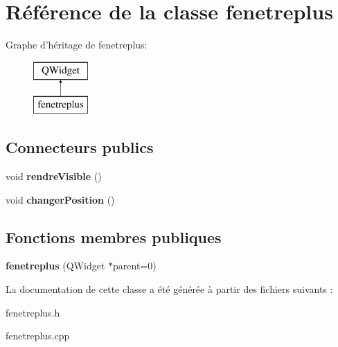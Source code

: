 \hypertarget{classfenetreplus}{\section{Référence de la classe fenetreplus}
\label{classfenetreplus}
}
Graphe d'héritage de fenetreplus\+:\begin{figure}[H]
\begin{center}
\leavevmode
\includegraphics[height=2.000000cm]{classfenetreplus}
\end{center}
\end{figure}
\subsection*{Connecteurs publics}
\begin{DoxyCompactItemize}
\item 
\hypertarget{classfenetreplus_a6fe7c527b188f24c973b901005132c86}{void {\bfseries rendre\+Visible} ()}\label{classfenetreplus_a6fe7c527b188f24c973b901005132c86}

\item 
\hypertarget{classfenetreplus_a6020068711d957c8a9d6918de1380395}{void {\bfseries changer\+Position} ()}\label{classfenetreplus_a6020068711d957c8a9d6918de1380395}

\end{DoxyCompactItemize}
\subsection*{Fonctions membres publiques}
\begin{DoxyCompactItemize}
\item 
\hypertarget{classfenetreplus_aeda6edd6e107593519deeda14e9e16b2}{{\bfseries fenetreplus} (Q\+Widget $\ast$parent=0)}\label{classfenetreplus_aeda6edd6e107593519deeda14e9e16b2}

\end{DoxyCompactItemize}


La documentation de cette classe a été générée à partir des fichiers suivants \+:\begin{DoxyCompactItemize}
\item 
fenetreplus.\+h\item 
fenetreplus.\+cpp\end{DoxyCompactItemize}
